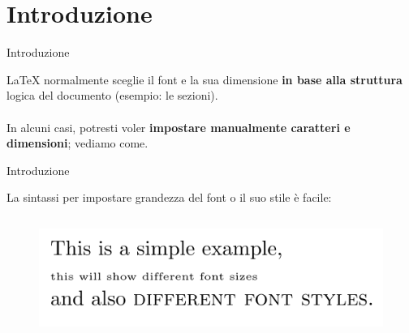 \section{Introduzione}

\begin{frame}{Introduzione}

    \LaTeX{} normalmente sceglie il font e la sua dimensione \textbf{in base alla struttura} logica del documento (esempio: le sezioni).\\\\ In alcuni casi, potresti voler \textbf{impostare manualmente caratteri e dimensioni}; vediamo come.

\end{frame}

\begin{frame}{Introduzione}

    La sintassi per impostare grandezza del font o il suo stile è facile:\\
    
    \begin{esempio}{}
           \inputminted[linenos] {latex}{res/examples/intro.tex}
    \end{esempio}
    
    \pause
    
    \begin{figure}
        \centering
        \includegraphics[scale=0.45]{res/images/intro.png}
    \end{figure}
    
\end{frame}
